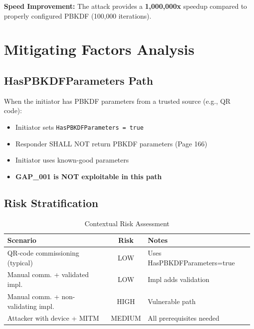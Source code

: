 \documentclass[11pt,a4paper]{article}
\begin{document}
\textbf{Speed Improvement:} The attack provides a \textbf{1,000,000x} speedup compared to properly configured PBKDF (100,000 iterations).

\section{Mitigating Factors Analysis}

\subsection{HasPBKDFParameters Path}

\begin{successbox}
When the initiator has PBKDF parameters from a trusted source (e.g., QR code):
\begin{itemize}
    \item Initiator sets \texttt{HasPBKDFParameters = true}
    \item Responder SHALL NOT return PBKDF parameters (Page 166)
    \item Initiator uses known-good parameters
    \item \textbf{GAP\_001 is NOT exploitable in this path}
\end{itemize}
\end{successbox}

\subsection{Risk Stratification}

\begin{table}[H]
\centering
\caption{Contextual Risk Assessment}
\begin{tabular}{|l|c|l|}
\hline
\rowcolor{lightgray}
\textbf{Scenario} & \textbf{Risk} & \textbf{Notes} \\
\hline
QR-code commissioning (typical) & \textcolor{successgreen}{LOW} & Uses HasPBKDFParameters=true \\
\hline
Manual comm. + validated impl. & \textcolor{successgreen}{LOW} & Impl adds validation \\
\hline
Manual comm. + non-validating impl. & \textcolor{criticalred}{HIGH} & Vulnerable path \\
\hline
Attacker with device + MITM & \textcolor{warningorange}{MEDIUM} & All prerequisites needed \\
\hline
\end{tabular}
\end{table}
\end{document}
